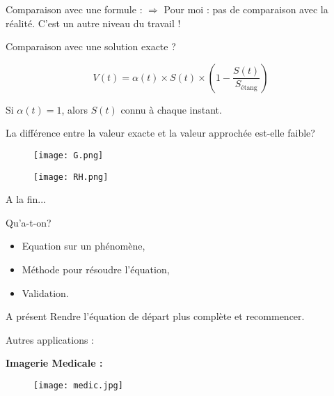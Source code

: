 \documentclass[11pt]{beamer}
\begin{document}
\begin{frame}{Comparaison avec une formule :}
$\Rightarrow$ Pour moi : pas de comparaison avec la réalité. C'est un autre niveau du travail !

Comparaison avec une solution exacte ?

$$V(t) = \alpha(t) \times S(t) \times \left( 1 - \dfrac{S(t)}{S_{\text{étang}}} \right)$$

Si $\alpha(t) = 1$, alors $S(t)$ connu à chaque instant.

\begin{exampleblock}{}
La différence entre la valeur exacte et la valeur approchée est-elle faible?
\end{exampleblock}

\end{frame}

\begin{frame}
\begin{figure}
\texttt{[image: G.png]}
\end{figure}
\end{frame}


\begin{frame}
\begin{figure}
\texttt{[image: RH.png]}
\end{figure}
\end{frame}

\begin{frame}{A la fin...}
\begin{block}{Qu'a-t-on?}
\begin{itemize}
\item Equation sur un phénomène,
\item Méthode pour résoudre l'équation,
\item Validation.
\end{itemize}
\end{block}

\begin{block}{A présent}
Rendre l'équation de départ plus complète et recommencer.
\end{block}

\end{frame}



\begin{frame}{Autres applications :}

\textbf{Imagerie Medicale :}
\begin{center}
\begin{figure}
\texttt{[image: medic.jpg]}
\end{figure}
\end{center}

\end{frame}
\end{document}
